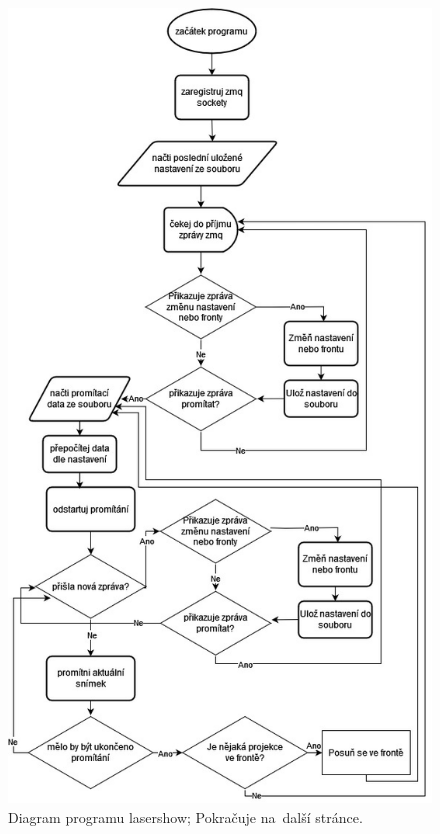 \begin{figure}[H]
  \centering
  \includegraphics[width=\textwidth{}, trim=0 600 0 0, clip]{img/lasershow_flowchart.jpg}
  \caption{\label{fig:lasershow-flowchart} Diagram programu lasershow; Pokračuje na~další stránce.}
\end{figure}
\clearpage
